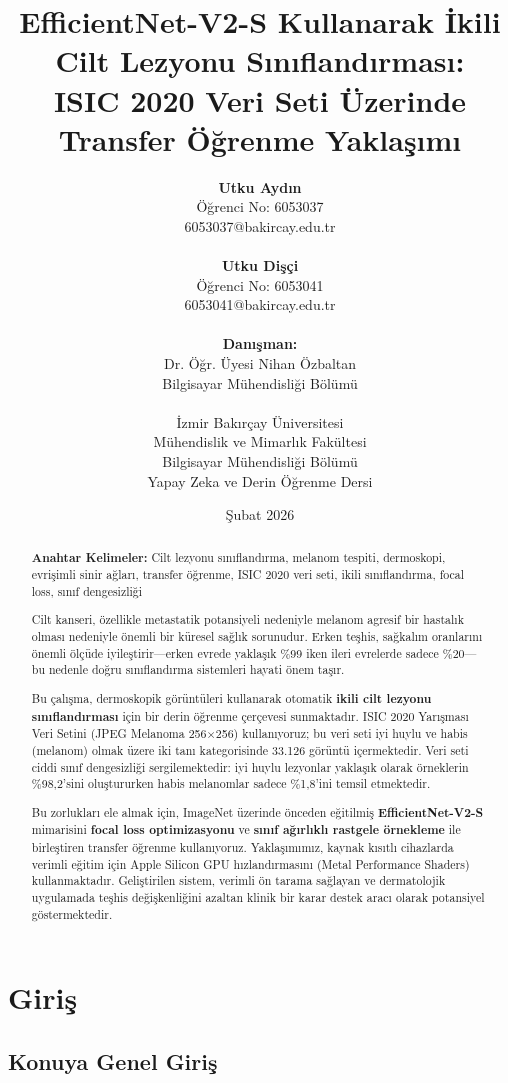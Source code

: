 \documentclass[12pt,a4paper]{article}
\title{\textbf{EfficientNet-V2-S Kullanarak İkili Cilt Lezyonu Sınıflandırması:}\\\textbf{ISIC 2020 Veri Seti Üzerinde Transfer Öğrenme Yaklaşımı}}
\author{
\textbf{Utku Aydın}\\
Öğrenci No: 6053037\\
6053037@bakircay.edu.tr\\
\\
\textbf{Utku Dişçi}\\
Öğrenci No: 6053041\\
6053041@bakircay.edu.tr\\
\\
\textbf{Danışman:}\\
Dr. Öğr. Üyesi Nihan Özbaltan\\
Bilgisayar Mühendisliği Bölümü\\
\\
İzmir Bakırçay Üniversitesi\\
Mühendislik ve Mimarlık Fakültesi\\
Bilgisayar Mühendisliği Bölümü\\
Yapay Zeka ve Derin Öğrenme Dersi
}
\date{Şubat 2026}
\begin{document}
\maketitle

\begin{abstract}
\noindent\textbf{Anahtar Kelimeler:} Cilt lezyonu sınıflandırma, melanom tespiti, dermoskopi, evrişimli sinir ağları, transfer öğrenme, ISIC 2020 veri seti, ikili sınıflandırma, focal loss, sınıf dengesizliği

\vspace{0.5cm}

Cilt kanseri, özellikle metastatik potansiyeli nedeniyle melanom agresif bir hastalık olması nedeniyle önemli bir küresel sağlık sorunudur. Erken teşhis, sağkalım oranlarını önemli ölçüde iyileştirir---erken evrede yaklaşık \%99 iken ileri evrelerde sadece \%20---bu nedenle doğru sınıflandırma sistemleri hayati önem taşır.

Bu çalışma, dermoskopik görüntüleri kullanarak otomatik \textbf{ikili cilt lezyonu sınıflandırması} için bir derin öğrenme çerçevesi sunmaktadır. ISIC 2020 Yarışması Veri Setini (JPEG Melanoma 256$\times$256) kullanıyoruz; bu veri seti iyi huylu ve habis (melanom) olmak üzere iki tanı kategorisinde 33.126 görüntü içermektedir. Veri seti ciddi sınıf dengesizliği sergilemektedir: iyi huylu lezyonlar yaklaşık olarak örneklerin \%98,2'sini oluştururken habis melanomlar sadece \%1,8'ini temsil etmektedir.

Bu zorlukları ele almak için, ImageNet üzerinde önceden eğitilmiş \textbf{EfficientNet-V2-S} mimarisini \textbf{focal loss optimizasyonu} ve \textbf{sınıf ağırlıklı rastgele örnekleme} ile birleştiren transfer öğrenme kullanıyoruz. Yaklaşımımız, kaynak kısıtlı cihazlarda verimli eğitim için Apple Silicon GPU hızlandırmasını (Metal Performance Shaders) kullanmaktadır. Geliştirilen sistem, verimli ön tarama sağlayan ve dermatolojik uygulamada teşhis değişkenliğini azaltan klinik bir karar destek aracı olarak potansiyel göstermektedir.
\end{abstract}

\newpage

\section{Giriş}

\subsection{Konuya Genel Giriş}
\end{document}
